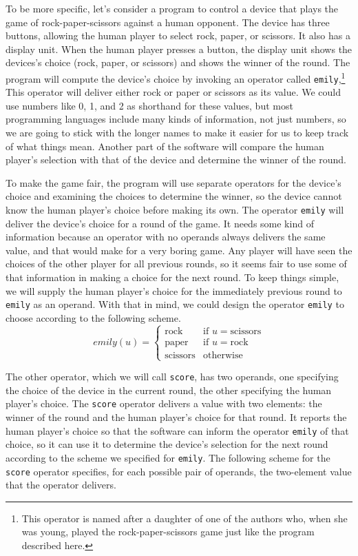 To be more specific, let's consider a program to control
a device that plays the game of rock-paper-scissors against a human opponent.
The device has three buttons, allowing the human player to select rock, paper, or
scissors.  It also has a display unit.
When the human player presses a button,
the display unit shows the devices's choice (rock, paper, or scissors)
and shows the winner of the round.
The program will compute the device's choice
by invoking an operator called \texttt{emily},\footnote{This operator is
named after a daughter of one of the authors who, when she was young,
played the rock-paper-scissors game just like the program described here.}
This operator will deliver
either rock or paper or scissors as its value.
We could use numbers like 0, 1, and 2 as shorthand for these values,
but most programming languages include many
kinds of information, not just numbers,
so we are going to stick with the longer names
to make it easier for us to keep track of what things mean.
Another part of the software will compare the human player's
selection with that of the device and determine the winner of the round.

To make the game fair, the program will use
separate operators for the device's choice and
examining the choices to determine the winner,
so the device cannot know the human player's choice before making its own.
The operator \texttt{emily} will deliver the device's choice for a round of the game.
It needs some kind of information because an operator with no operands
always delivers the same value, and that would make for a very boring game.
Any player will have seen the choices of the other player for
all previous rounds, so it seems fair to use some of that information in
making a choice for the next round.
To keep things simple, we will supply the human player's choice for the
immediately previous round to \texttt{emily} as an operand.
With that in mind, we could design the operator \texttt{emily} to choose
according to the following scheme.
\begin{displaymath}
emily(u) =
   \left\{
        \begin{array}{ll}
        \mbox{rock}     & \mbox{if } u = \mbox{scissors} \\
        \mbox{paper}    & \mbox{if } u = \mbox{rock} \\
        \mbox{scissors} & \mbox{otherwise}
        \end{array}
   \right.
\end{displaymath}

The other operator, which we will call \texttt{score},
has two operands, one specifying the choice of the device in the current round,
the other specifying the human player's choice.
The \texttt{score} operator delivers a value with two elements:
the winner of the round and the human player's choice for that round.
It reports the human player's choice so that the software
can inform  the operator \texttt{emily} of that choice,
so it can use it to determine the device's selection for the next round
according to the scheme we specified for \texttt{emily}.
The following scheme for the \texttt{score} operator specifies,
for each possible pair of operands,
the two-element value that the operator delivers.

